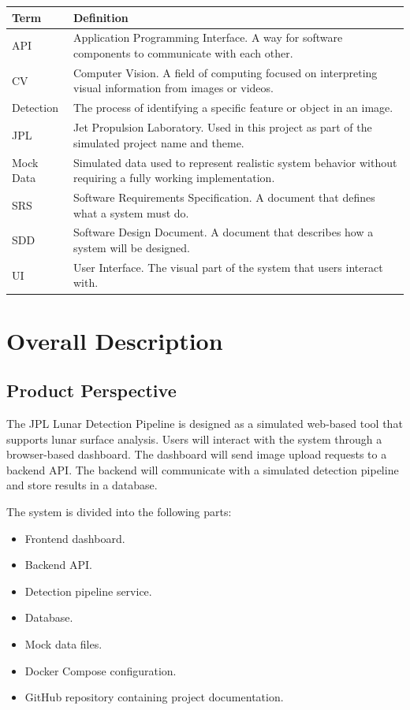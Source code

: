 \documentclass[12pt]{article}
\begin{document}
\begin{longtable}{|p{1.5in}|p{4.5in}|}
\hline
\textbf{Term} & \textbf{Definition} \\
\hline
API & Application Programming Interface. A way for software components to communicate with each other. \\
\hline
CV & Computer Vision. A field of computing focused on interpreting visual information from images or videos. \\
\hline
Detection & The process of identifying a specific feature or object in an image. \\
\hline
JPL & Jet Propulsion Laboratory. Used in this project as part of the simulated project name and theme. \\
\hline
Mock Data & Simulated data used to represent realistic system behavior without requiring a fully working implementation. \\
\hline
SRS & Software Requirements Specification. A document that defines what a system must do. \\
\hline
SDD & Software Design Document. A document that describes how a system will be designed. \\
\hline
UI & User Interface. The visual part of the system that users interact with. \\
\hline
\end{longtable}

\section{Overall Description}

\subsection{Product Perspective}

The JPL Lunar Detection Pipeline is designed as a simulated web-based tool that supports lunar surface analysis. Users will interact with the system through a browser-based dashboard. The dashboard will send image upload requests to a backend API. The backend will communicate with a simulated detection pipeline and store results in a database.

The system is divided into the following parts:

\begin{itemize}
    \item Frontend dashboard.
    \item Backend API.
    \item Detection pipeline service.
    \item Database.
    \item Mock data files.
    \item Docker Compose configuration.
    \item GitHub repository containing project documentation.
\end{itemize}
\end{document}

